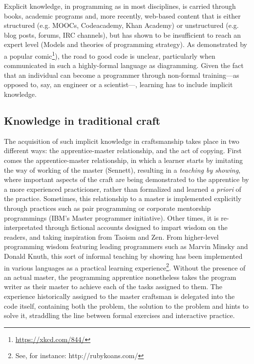 \documentclass{article}
\begin{document}
Explicit knowledge, in programming as in most disciplines, is carried through books, academic programs and, more recently, web-based content that is either structured (e.g. MOOCs, Codeacademy, Khan Academy) or unstructured (e.g. blog posts, forums, IRC channels), but has shown to be insufficient to reach an expert level (Models and theories of programming strategy). As demonstrated by a popular comic\footnote{\url{https://xkcd.com/844/}}), the road to good code is unclear, particularly when communicated in such a highly-formal language as diagramming. Given the fact that an individual can become a programmer through non-formal training---as opposed to, say, an engineer or a scientist---, learning has to include implicit knowledge.

\subsection{Knowledge in traditional craft}

The acquisition of such implicit knowledge in craftsmanship takes place in two different ways: the apprentice-master relationship, and the act of copying. First comes the apprentice-master relationship, in which a learner starts by  imitating the way of working of the master (Sennett), resulting in a \emph{teaching by showing}, where important aspects of the craft are being demonstrated to the apprentice by a more experienced practicioner, rather than formalized and learned \emph{a priori} of the practice. Sometimes, this relationship to a master is implemented explicitly through practices such as pair programming\cite{williams_pair_2003} or corporate mentorship programmings (IBM's Master programmer initiative). Other times, it is re-interpretated through fictional accounts designed to impart wisdom on the readers, and taking inspiration from Taoism and Zen\cite{james_tao_1987,raymond_new_1996}. From higher-level programming wisdom featuring leading programmers such as Marvin Minsky and Donald Knuth, this sort of informal teaching by showing has been implemented in various languages as a practical learning experience\footnote{See, for instance: http://rubykoans.com/}. Without the presence of an actual master, the programming apprentice nonetheless takes the program writer as their master to achieve each of the tasks assigned to them. The experience historically assigned to the master craftsman is delegated into the code itself, containing both the problem, the solution to the problem and hints to solve it, straddling the line between formal exercises and interactive practice.
\end{document}
